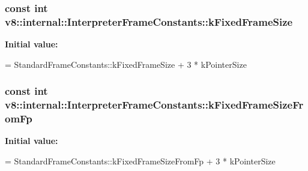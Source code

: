\subsubsection[{\texorpdfstring{k\+Fixed\+Frame\+Size}{kFixedFrameSize}}]{\setlength{\rightskip}{0pt plus 5cm}const int v8\+::internal\+::\+Interpreter\+Frame\+Constants\+::k\+Fixed\+Frame\+Size\hspace{0.3cm}{\ttfamily [static]}}\hypertarget{classv8_1_1internal_1_1_interpreter_frame_constants_aede03551d3015c81bea03fc7d7fe990f}{}\label{classv8_1_1internal_1_1_interpreter_frame_constants_aede03551d3015c81bea03fc7d7fe990f}
{\bfseries Initial value\+:}
\begin{DoxyCode}
=
      StandardFrameConstants::kFixedFrameSize + 3 * kPointerSize
\end{DoxyCode}
\subsubsection[{\texorpdfstring{k\+Fixed\+Frame\+Size\+From\+Fp}{kFixedFrameSizeFromFp}}]{\setlength{\rightskip}{0pt plus 5cm}const int v8\+::internal\+::\+Interpreter\+Frame\+Constants\+::k\+Fixed\+Frame\+Size\+From\+Fp\hspace{0.3cm}{\ttfamily [static]}}\hypertarget{classv8_1_1internal_1_1_interpreter_frame_constants_a578fca20894173d10d489059fb311afd}{}\label{classv8_1_1internal_1_1_interpreter_frame_constants_a578fca20894173d10d489059fb311afd}
{\bfseries Initial value\+:}
\begin{DoxyCode}
=
      StandardFrameConstants::kFixedFrameSizeFromFp + 3 * kPointerSize
\end{DoxyCode}

